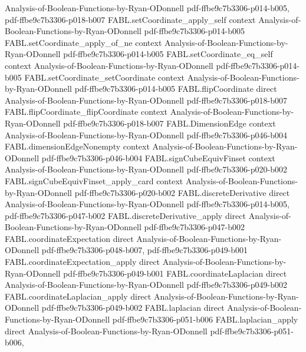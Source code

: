 \begin{theorem}
  {Analysis-of-Boolean-Functions-by-Ryan-ODonnell}
  {pdf-ffbe9c7b3306-p014-b005,
    pdf-ffbe9c7b3306-p018-b007}
\proofstep
  {FABL.setCoordinate_apply_self}
  {context}
  {Analysis-of-Boolean-Functions-by-Ryan-ODonnell}
  {pdf-ffbe9c7b3306-p014-b005}
\proofstep
  {FABL.setCoordinate_apply_of_ne}
  {context}
  {Analysis-of-Boolean-Functions-by-Ryan-ODonnell}
  {pdf-ffbe9c7b3306-p014-b005}
\proofstep
  {FABL.setCoordinate_eq_self}
  {context}
  {Analysis-of-Boolean-Functions-by-Ryan-ODonnell}
  {pdf-ffbe9c7b3306-p014-b005}
\proofstep
  {FABL.setCoordinate_setCoordinate}
  {context}
  {Analysis-of-Boolean-Functions-by-Ryan-ODonnell}
  {pdf-ffbe9c7b3306-p014-b005}
\proofstep
  {FABL.flipCoordinate}
  {direct}
  {Analysis-of-Boolean-Functions-by-Ryan-ODonnell}
  {pdf-ffbe9c7b3306-p018-b007}
\proofstep
  {FABL.flipCoordinate_flipCoordinate}
  {context}
  {Analysis-of-Boolean-Functions-by-Ryan-ODonnell}
  {pdf-ffbe9c7b3306-p018-b007}
\proofstep
  {FABL.DimensionEdge}
  {context}
  {Analysis-of-Boolean-Functions-by-Ryan-ODonnell}
  {pdf-ffbe9c7b3306-p046-b004}
\proofstep
  {FABL.dimensionEdgeNonempty}
  {context}
  {Analysis-of-Boolean-Functions-by-Ryan-ODonnell}
  {pdf-ffbe9c7b3306-p046-b004}
\proofstep
  {FABL.signCubeEquivFinset}
  {context}
  {Analysis-of-Boolean-Functions-by-Ryan-ODonnell}
  {pdf-ffbe9c7b3306-p020-b002}
\proofstep
  {FABL.signCubeEquivFinset_apply_card}
  {context}
  {Analysis-of-Boolean-Functions-by-Ryan-ODonnell}
  {pdf-ffbe9c7b3306-p020-b002}
\proofstep
  {FABL.discreteDerivative}
  {direct}
  {Analysis-of-Boolean-Functions-by-Ryan-ODonnell}
  {pdf-ffbe9c7b3306-p014-b005,
    pdf-ffbe9c7b3306-p047-b002}
\proofstep
  {FABL.discreteDerivative_apply}
  {direct}
  {Analysis-of-Boolean-Functions-by-Ryan-ODonnell}
  {pdf-ffbe9c7b3306-p047-b002}
\proofstep
  {FABL.coordinateExpectation}
  {direct}
  {Analysis-of-Boolean-Functions-by-Ryan-ODonnell}
  {pdf-ffbe9c7b3306-p048-b007,
    pdf-ffbe9c7b3306-p049-b001}
\proofstep
  {FABL.coordinateExpectation_apply}
  {direct}
  {Analysis-of-Boolean-Functions-by-Ryan-ODonnell}
  {pdf-ffbe9c7b3306-p049-b001}
\proofstep
  {FABL.coordinateLaplacian}
  {direct}
  {Analysis-of-Boolean-Functions-by-Ryan-ODonnell}
  {pdf-ffbe9c7b3306-p049-b002}
\proofstep
  {FABL.coordinateLaplacian_apply}
  {direct}
  {Analysis-of-Boolean-Functions-by-Ryan-ODonnell}
  {pdf-ffbe9c7b3306-p049-b002}
\proofstep
  {FABL.laplacian}
  {direct}
  {Analysis-of-Boolean-Functions-by-Ryan-ODonnell}
  {pdf-ffbe9c7b3306-p051-b006}
\proofstep
  {FABL.laplacian_apply}
  {direct}
  {Analysis-of-Boolean-Functions-by-Ryan-ODonnell}
  {pdf-ffbe9c7b3306-p051-b006,
}
\end{theorem}
